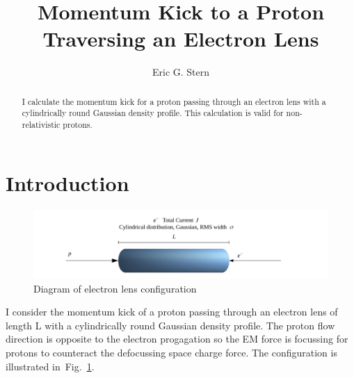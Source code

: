 \documentclass[acus]{jacow}
\begin{document}
\title{Momentum Kick to a Proton Traversing an Electron Lens}

\author{Eric G. Stern}

\maketitle

\begin{abstract}
  I calculate the momentum kick for a proton passing through an electron lens
  with a cylindrically round Gaussian density profile.
  This calculation is valid for non-relativistic protons.
\end{abstract}

\section{Introduction}

\begin{figure}[!htb]
   \centering
   \includegraphics*[width=\columnwidth]{e_lens_sketch.pdf}
   \caption{Diagram of electron lens configuration }
   \label{e_lens_sketch}
\end{figure}


I consider the momentum kick of a proton passing through an electron lens
of length L with a cylindrically round Gaussian density profile.
The proton flow direction is opposite to the electron progagation so the
EM force is focussing for protons to counteract the defocussing space charge
force.
The configuration is illustrated in~Fig.~\ref{e_lens_sketch}.
\end{document}
